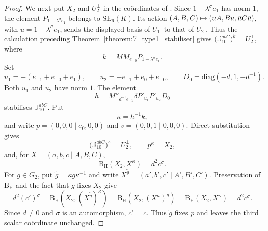 \documentclass{amsart}
\def\ovu{\mathord{\mbox{\hspace*{0pt}}\,\overline{\!u\!\!\;}\!\:}\mbox{\hspace*{0pt}}}
\newcommand{\diag}{\mathrm{diag}}
\newcommand{\SE}{\mathrm{SE}}
\newcommand{\J}{\mathbb{J}}
\newcommand{\B}{\mathrm{B}}
\renewcommand{\H}{\mathrm{H}}
\newcommand{\s}{\sigma}
\theoremstyle{plain}
\numberwithin{theorem}{section}
\theoremstyle{definition}
\begin{document}
\begin{proof}
	We next put $X_2$ and $U_2^{\perp}$ in the co\"{o}rdinates of
	\cite[Lemma~11.5]{BSW1}.  Since $1-\lambda^{\s}e_1$ has norm $1$, the
	element $P_{1-\lambda^{\s}e_1}$ belongs to $\SE_6(K)$.  Its action
	$(A,B,C)\mapsto(uA,Bu,\ovu C\ovu)$, with $u=1-\lambda^{\s}e_1$, sends
	the displayed basis of $U_1^{\perp}$ to that of $U_2^{\perp}$.
	Thus the calculation preceding Theorem~\ref{theorem:7_type1_stabiliser}
	gives $\bigl(\J_{10}^{abC}\bigr)^k=U_2^{\perp}$, where
	\begin{equation}
		\label{eq:7_type2_k}
		k=M M_{e_{-0}}P_{1-\lambda^{\s}e_1}.
	\end{equation}
	Set
	\begin{equation*}
		u_1=-(e_{-1}+e_{-0}+e_1),\qquad
		u_2=-e_{-1}+e_0+e_{-0},\qquad
		D_0=\diag(-d,1,-d^{-1}).
	\end{equation*}
	Both $u_1$ and $u_2$ have norm $1$.  The element
	\begin{equation}
		\label{eq:7_type2_h}
		h=M''_{d^{-1}e_{-1}}\delta P'_{u_1}P'_{u_2}D_0
	\end{equation}
	stabilises $\J_{10}^{abC}$.  Put
	\begin{equation}
		\label{eq:7_type2_kappa}
		\kappa=h^{-1}k,
	\end{equation}
	and write $p=(0,0,0\mid e_0,0,0)$ and $v=(0,0,1\mid0,0,0)$.
	Direct substitution gives
	\begin{equation*}
		\bigl(\J_{10}^{abC}\bigr)^\kappa=U_2^{\perp},\qquad
		p^\kappa=X_2,
	\end{equation*}
	and, for $X=(a,b,c\mid A,B,C)$,
	\begin{equation}
		\label{eq:7_type2_kappa_pairing}
		\B_{\H}(X_2,X^\kappa)=d^2c^{\s}.
	\end{equation}
	For $g\in G_2$, put $\widetilde g=\kappa g\kappa^{-1}$ and write
	$X^{\widetilde g}=(a',b',c'\mid A',B',C')$.  Preservation of
	$\B_{\H}$ and the fact that $g$ fixes $X_2$ give
	\begin{equation*}
		d^2(c')^{\s}=\B_{\H}(X_2,(X^{\widetilde g})^\kappa)
		=\B_{\H}(X_2,(X^\kappa)^g)
		=\B_{\H}(X_2,X^\kappa)=d^2c^{\s}.
	\end{equation*}
	Since $d\neq0$ and $\s$ is an automorphism, $c'=c$.  Thus
	$\widetilde g$ fixes $p$ and leaves the third scalar co\"{o}rdinate unchanged.


\end{proof}
\end{document}
